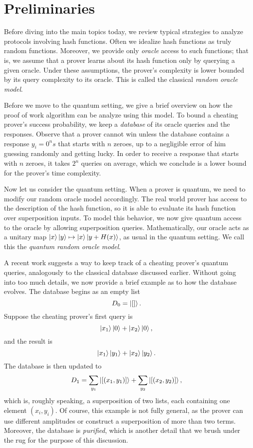 \section{Preliminaries}

Before diving into the main topics today, we review typical strategies to analyze protocols involving hash functions.
Often we idealize hash functions as truly random functions.
Moreover, we provide only \emph{oracle} access to such functions;
that is, we assume that a prover learns about its hash function only by querying a given oracle.
Under these assumptions, the prover's complexity is lower bounded by its query complexity to its oracle.
This is called the classical \emph{random oracle model}.

Before we move to the quantum setting, we give a brief overview on how the proof of work algorithm can be analyze using this model.
To bound a cheating prover's success probability,
we keep a \emph{database} of its oracle queries and the responses.
Observe that a prover cannot win unless the database contains a response $y_i=0^ns$ that starts with $n$ zeroes,
up to a negligible error of him guessing randomly and getting lucky.
In order to receive a response that starts with $n$ zeroes, it takes $2^n$ queries on average,
which we conclude is a lower bound for the prover's time complexity.

Now let us consider the quantum setting.
When a prover is quantum, we need to modify our random oracle model accordingly.
The real world prover has access to the description of the hash function,
so it is able to evaluate its hash function over superposition inputs.
To model this behavior, we now give quantum access to the oracle by allowing superposition queries.
Mathematically, our oracle acts as a unitary map $\ket{x}\ket{y}\mapsto\ket{x}\ket{y+H(x)}$, as usual in the quantum setting.
We call this the \emph{quantum random oracle model}.

A recent work \cite{compressed-oracles} suggests a way to keep track of a cheating prover's quantum queries,
analogously to the classical database discussed earlier.
Without going into too much details,
we now provide a brief example as to how the database evolves.
The database begins as an empty list
$$D_0=\ket{[]}.$$
Suppose the cheating prover's first query is
$$\ket{x_1}\ket{0}+\ket{x_2}\ket{0},$$
and the result is
$$\ket{x_1}\ket{y_1}+\ket{x_2}\ket{y_2}.$$
The database is then updated to
$$D_1=\sum_{y_1}\ket{[(x_1, y_1)]} + \sum_{y_2}\ket{[(x_2, y_2)]},$$
which is, roughly speaking, a superposition of two lists,
each containing one element $(x_i, y_i)$.
Of course, this example is not fully general,
as the prover can use different amplitudes or construct a superposition of more than two terms.
Moreover, the database is \emph{purified},
which is another detail that we brush under the rug for the purpose of this discussion.


